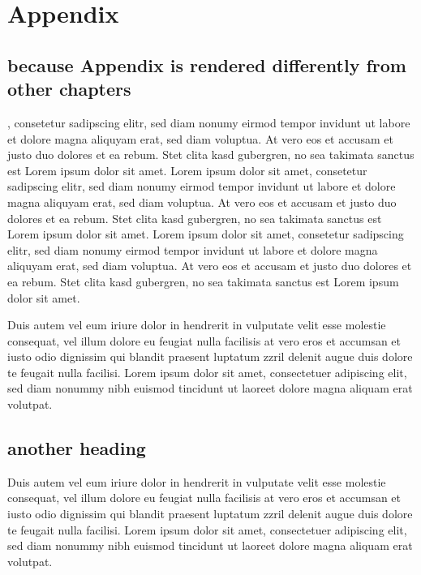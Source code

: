 \documentclass[10pt,twoside,twocolumn,openany,nodeprecatedcode]{dndbook}
\begin{document}
\chapter{Appendix}

\section{because Appendix is rendered differently from other chapters}

, consetetur sadipscing elitr, sed diam nonumy eirmod tempor invidunt ut labore et dolore magna aliquyam erat, sed diam voluptua. At vero eos et accusam et justo duo dolores et ea rebum. Stet clita kasd gubergren, no sea takimata sanctus est Lorem ipsum dolor sit amet. Lorem ipsum dolor sit amet, consetetur sadipscing elitr, sed diam nonumy eirmod tempor invidunt ut labore et dolore magna aliquyam erat, sed diam voluptua. At vero eos et accusam et justo duo dolores et ea rebum. Stet clita kasd gubergren, no sea takimata sanctus est Lorem ipsum dolor sit amet. Lorem ipsum dolor sit amet, consetetur sadipscing elitr, sed diam nonumy eirmod tempor invidunt ut labore et dolore magna aliquyam erat, sed diam voluptua. At vero eos et accusam et justo duo dolores et ea rebum. Stet clita kasd gubergren, no sea takimata sanctus est Lorem ipsum dolor sit amet.

Duis autem vel eum iriure dolor in hendrerit in vulputate velit esse molestie consequat, vel illum dolore eu feugiat nulla facilisis at vero eros et accumsan et iusto odio dignissim qui blandit praesent luptatum zzril delenit augue duis dolore te feugait nulla facilisi. Lorem ipsum dolor sit amet, consectetuer adipiscing elit, sed diam nonummy nibh euismod tincidunt ut laoreet dolore magna aliquam erat volutpat.

\section{another heading}

Duis autem vel eum iriure dolor in hendrerit in vulputate velit esse molestie consequat, vel illum dolore eu feugiat nulla facilisis at vero eros et accumsan et iusto odio dignissim qui blandit praesent luptatum zzril delenit augue duis dolore te feugait nulla facilisi. Lorem ipsum dolor sit amet, consectetuer adipiscing elit, sed diam nonummy nibh euismod tincidunt ut laoreet dolore magna aliquam erat volutpat.
\end{document}
